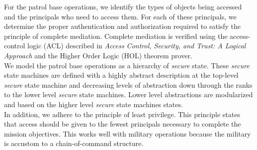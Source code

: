 For the patrol base operations, we identify the types of objects being accessed and the principals who need to access
them.  For each of these principals, we determine the proper authentication and authorization required to satisfy the
principle of complete mediation.  Complete mediation is verified using the access-control logic (ACL) described in
\emph{Access Control, Security, and Trust: A Logical Approach} \cite{acst}  and  the Higher Order Logic (HOL) theorem prover.\\

We model the patrol base operations as a hierarchy of \emph{secure} state.  These \emph{secure} state machines are defined with
a highly abstract description at the top-level \emph{secure} state machine and decreasing levels of abstraction down through
the ranks to the lower level \emph{secure} state machines.  Lower level abstractions are modularized and based on the higher
level \emph{secure} state machines states. \\

In addition, we adhere to the principle of least privilege.  This principle states that access should be given to the
fewest principals necessary to complete the mission objectives.  This works well with military operations because the
military is accustom to a chain-of-command structure.  




